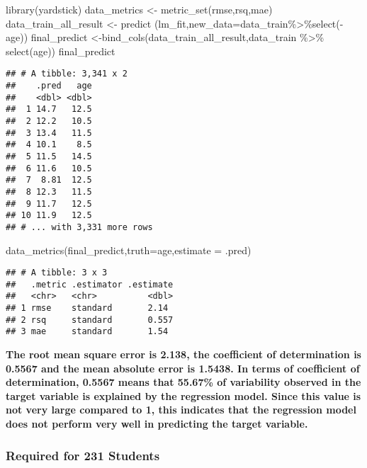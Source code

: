 \documentclass[
]{article}
\newenvironment{Shaded}{\begin{snugshade}}{\end{snugshade}}
\newcommand{\AttributeTok}[1]{\textcolor[rgb]{0.77,0.63,0.00}{#1}}
\newcommand{\FunctionTok}[1]{\textcolor[rgb]{0.00,0.00,0.00}{#1}}
\newcommand{\NormalTok}[1]{#1}
\newcommand{\OtherTok}[1]{\textcolor[rgb]{0.56,0.35,0.01}{#1}}
\newcommand{\SpecialCharTok}[1]{\textcolor[rgb]{0.00,0.00,0.00}{#1}}
\begin{document}
\begin{Shaded}
\begin{Highlighting}[]
\FunctionTok{library}\NormalTok{(yardstick)}
\NormalTok{data\_metrics }\OtherTok{\textless{}{-}} \FunctionTok{metric\_set}\NormalTok{(rmse,rsq,mae)}
\NormalTok{data\_train\_all\_result }\OtherTok{\textless{}{-}} \FunctionTok{predict}\NormalTok{ (lm\_fit,}\AttributeTok{new\_data=}\NormalTok{data\_train}\SpecialCharTok{\%\textgreater{}\%}\FunctionTok{select}\NormalTok{(}\SpecialCharTok{{-}}\NormalTok{age))}
\NormalTok{final\_predict }\OtherTok{\textless{}{-}}\FunctionTok{bind\_cols}\NormalTok{(data\_train\_all\_result,data\_train }\SpecialCharTok{\%\textgreater{}\%} \FunctionTok{select}\NormalTok{(age)) }
\NormalTok{final\_predict}
\end{Highlighting}
\end{Shaded}

\begin{verbatim}
## # A tibble: 3,341 x 2
##    .pred   age
##    <dbl> <dbl>
##  1 14.7   12.5
##  2 12.2   10.5
##  3 13.4   11.5
##  4 10.1    8.5
##  5 11.5   14.5
##  6 11.6   10.5
##  7  8.81  12.5
##  8 12.3   11.5
##  9 11.7   12.5
## 10 11.9   12.5
## # ... with 3,331 more rows
\end{verbatim}

\begin{Shaded}
\begin{Highlighting}[]
\FunctionTok{data\_metrics}\NormalTok{(final\_predict,}\AttributeTok{truth=}\NormalTok{age,}\AttributeTok{estimate =}\NormalTok{ .pred)}
\end{Highlighting}
\end{Shaded}

\begin{verbatim}
## # A tibble: 3 x 3
##   .metric .estimator .estimate
##   <chr>   <chr>          <dbl>
## 1 rmse    standard       2.14 
## 2 rsq     standard       0.557
## 3 mae     standard       1.54
\end{verbatim}

\textbf{The root mean square error is 2.138, the coefficient of
determination is 0.5567 and the mean absolute error is 1.5438. In terms
of coefficient of determination, 0.5567 means that 55.67\% of
variability observed in the target variable is explained by the
regression model. Since this value is not very large compared to 1, this
indicates that the regression model does not perform very well in
predicting the target variable.}

\hypertarget{required-for-231-students}{%
\subsubsection{Required for 231
Students}\label{required-for-231-students}}
\end{document}
